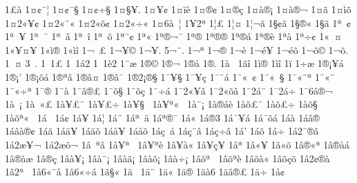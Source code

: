 {1^^a3^^e0
1^^a4^^a2^^a8^^a6
1^^a4^^a2^^a8^^a7
1^^a4^^a2^^f7^^a7
1^^a4^^a7^^a5.
1^^a4^^ad^^a5^^a2^^ad
1^^a4^^ad^^ef^^e8
1^^a4^^ae^^a2
1^^a4^^ae^^e7
1^^a4^^e0^^ae^^a1
1^^a4^^e0^^ae^^ac
1^^a4^^e3^^ad
1^^a4^^ec^^f5
1^^a42^^ab^^a5^^a2
1^^a42^^ab^^a8^^ab
1^^a42^^ab^^f5^^a2
1^^a42^^ab^^f7^^ab
1^^a46^^e0^^a0^^a6
1^^a52^^aa
1^^a6^^a3
1^^a6^^a4
1^^a6^^ac^^e3
1^^a7^^a2^^e3
1^^a7^^ae^^ab
1^^a7^^e3
1^^aa^^a0^^a2
1^^aa^^a0^^a5
1^^aa^^a0^^af
1^^aa^^a0^^e2
1^^aa^^a0^^ee
1^^aa^^a0^^f5
1^^aa^^a8^^a2
1^^aa^^ab
1^^aa^^ae^^ac^^af
1^^aa^^ae^^ad
1^^aa^^ae^^ae
1^^aa^^ae^^e1
1^^aa^^ae^^e8
1^^aa^^e0
1^^aa^^f7^^a2
1^^ab^^a0^^ad^^a4
1^^ab^^a5^^a4^^a5
1^^ab^^ec^^ae
1^^ab^^ec^^ee
1^^ac^^a0^^a3
1^^ac^^a5^^a9
1^^ac^^a5^^ad.
5^^ac^^a8.
1^^ac^^aa^^ad
1^^ac^^ae^^ad
1^^ac^^e8
1^^ac^^e9^^a5
1^^ac^^e9^^f5
1^^ac^^f5^^a9
1^^ac^^f5^^ad.
1^^ad^^a0^^a4
3^^ad^^a0.
1^^ad^^a01^^a3
1^^ad^^a01^^e12
1^^ad^^a01^^e82
1^^ad^^a8^^e6
1^^ad^^ae^^a9
1^^ad^^ae^^ac
1^^ad^^ae^^e5
1^^ad^^ae.
1^^ad^^e0^^a0
1^^ad^^e3^^ee
1^^ad^^ec^^ae
1^^ad^^ec^^ee
1^^ad^^ef
1^^ad^^f7^^e6
1^^ae^^a1^^a5^^e1
1^^ae^^a1'
1^^ae^^a1^^f5^^e1
1^^ae^^aa^^e2
1^^ae^^e2^^a4
1^^ae^^e2^^af
1^^ae2^^a1^^ae^^a7
1^^af^^a5^^ad^^a7
1^^af^^a5^^e7
1^^af^^a8^^e1
1^^af^^ab^^a0^^a2
1^^af^^ab^^a0^^a7
1^^af^^ab^^a8^^aa
1^^af^^ab^^a8
1^^af^^ab^^f7^^aa
1^^af^^ae
1^^af^^e0
1^^af^^e2^^ae^^a3
1^^af^^f5^^ad^^a7
1^^af^^f5^^e7
1^^af^^f7^^e1
1^^af2^^ab^^a5^^e2
1^^af2^^ab^^f5^^e2
1^^af2^^e1^^a8
1^^af2^^e1^^f7
1^^af6^^e2^^ae^^ac
1^^e0^^a0^^a1
1^^e0^^a0^^ab^^a3
1^^e0^^a5^^a3^^a8
1^^e0^^a5^^a3^^f7
1^^e0^^a5^^a7^^a0
1^^e0^^a5^^aa^^ab^^a0
1^^e0^^a8^^a1
1^^e0^^ae^^e1^^e8
1^^e0^^f5^^a3^^a8
1^^e0^^f5^^a3^^f7
1^^e0^^f5^^a7^^a0
1^^e0^^f5^^aa^^ab^^a0
1^^e1^^a0
1^^e1^^a2
1^^e1^^a5
1^^e1^^a6
1^^e1^^a8
1^^e1^^aa^^a0^^e4
1^^e1^^aa^^ae^^af
1^^e1^^ab
1^^e1^^ae3
1^^e1^^af^^a5^^ad^^e1
1^^e1^^af^^f5^^ad^^e1
1^^e1^^e0
1^^e1^^e2^^ae
1^^e1^^e2^^e0^^ae^^a2
1^^e1^^e3
1^^e1^^e4^^a5
1^^e1^^e4^^f5
1^^e1^^e5^^a5
1^^e1^^e5^^f5
1^^e1^^e7^^a0^^e1
1^^e1^^e7^^a8^^e2
1^^e1^^e7^^f7^^e2
1^^e1'
1^^e1^^f5
1^^e1^^f7
1^^e12^^af^^ae^^e2
1^^e12^^e6^^a5^^ac
1^^e12^^e6^^f5^^ac
1^^e2^^a0^^aa^^e2
1^^e2^^a5^^aa^^a0
1^^e2^^a5^^aa^^e8
1^^e2^^a5^^e0^^ab
1^^e2^^a5^^e7^^a5
1^^e2^^aa^^ad
1^^e2^^ab^^a5
1^^e2^^ab^^f5
1^^e2^^ae^^ab^^aa
1^^e2^^ae^^e0^^e1
1^^e2^^ae^^e0^^e6
1^^e2^^ae^^e7^^ad
1^^e2^^e0^^a5^^a1
1^^e2^^e0^^a8^^a1
1^^e2^^e0^^e3^^a1
1^^e2^^e0^^f5^^a1
1^^e2^^e0^^f7^^a1
1^^e2^^f5^^aa^^a0
1^^e2^^f5^^aa^^e8
1^^e2^^f5^^e0^^ab
1^^e2^^f5^^e7^^f5
1^^e22^^a2^^ae^^e0
1^^e22^^aa^^a0^^ad
1^^e26^^ab^^a8^^e2
1^^e26^^ab^^f7^^e2
1^^e3^^a7^^ab
1^^e4^^a0
1^^e4^^a8
1^^e4^^ab
1^^e4^^ae
1^^e4^^e06
1^^e4^^e2^^ae^^ad^^a3
1^^e4^^f7
1^^e5^^a2
}
